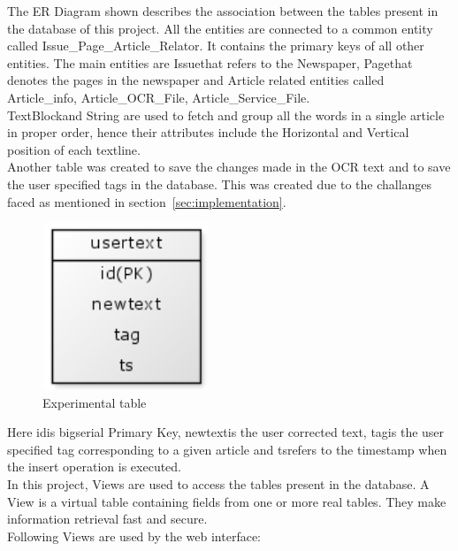 \documentclass[12pt]{article}
\begin{document}
The ER Diagram shown describes the association between the tables present in the database of this project. All the entities are connected to a common entity called \textgravedbl Issue\_Page\_Article\_Relator\textasciidieresis. It contains the primary keys of all other entities. The main entities are \textgravedbl Issue\textasciidieresis that refers to the Newspaper, \textgravedbl Page\textasciidieresis that denotes the pages in the newspaper and Article related entities called \textgravedbl Article\_info\textasciidieresis, \textgravedbl Article\_OCR\_File\textasciidieresis, \textgravedbl Article\_Service\_File\textasciidieresis.\\ \textgravedbl TextBlock\textasciidieresis and \textgravedbl String \textasciidieresis are used to fetch and group all the words in a single article in proper order, hence their attributes include the Horizontal and Vertical position of each textline.\\
Another table was created to save the changes made in the OCR text and to save the user specified tags in the database. This was created due to the challanges faced as mentioned in section~\ref{sec:implementation}.

\begin{figure}[ht!]
\centering
\includegraphics[width=5cm,height=5cm]{entity.jpg}
\caption{Experimental table}
\label{fig:3}
\end{figure}

Here \textgravedbl id\textasciidieresis is bigserial Primary Key, \textgravedbl newtext\textasciidieresis is the user corrected text, \textgravedbl tag\textasciidieresis is the user specified tag corresponding to a given article and \textgravedbl ts\textasciidieresis refers to the timestamp when the insert operation is executed.\\

In this project, Views are used to access the tables present in the database. A View is a virtual table containing fields from one or more real tables. They make information retrieval fast and secure.\\
Following Views are used by the web interface:\\
\end{document}
